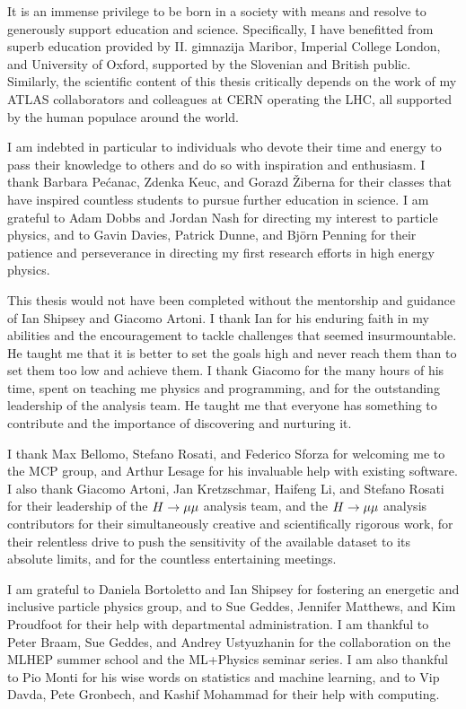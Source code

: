\begin{acknowledgements}

It is an immense privilege to be born in a society with means and resolve
to generously support education and science. Specifically, I have benefitted
from superb education provided by II. gimnazija Maribor, Imperial College
London, and University of Oxford, supported by the Slovenian and British
public. Similarly, the scientific content of this thesis critically depends
on the work of my ATLAS collaborators and colleagues at CERN operating the
LHC, all supported by the human populace around the world.

I am indebted in particular to individuals who devote their time and energy
to pass their knowledge to others and do so with inspiration and enthusiasm.
I thank Barbara Pe\'canac, Zdenka Keuc, and Gorazd
\v{Z}iberna for their classes that have inspired countless students to pursue
further education in science. I am grateful to Adam Dobbs and Jordan Nash for
directing my interest to particle physics, and to Gavin Davies, Patrick Dunne,
and Bj\"{o}rn Penning for their patience and perseverance in directing my
first research efforts in high energy physics.

This thesis would not have been completed without the mentorship and guidance
of Ian Shipsey and Giacomo Artoni. I thank Ian for his enduring faith in my
abilities and the encouragement to tackle challenges that seemed insurmountable.
He taught me that it is better to set the goals high and never reach them
than to set them too low and achieve them.
I thank Giacomo for the many hours of his time, spent on teaching me physics and
programming, and for the outstanding leadership of the analysis team. He taught
me that everyone has something to contribute and the importance of discovering 
and nurturing it.

I thank Max Bellomo, Stefano Rosati, and Federico Sforza for welcoming me to
the MCP group, and Arthur Lesage for his invaluable help with existing
software. I also thank Giacomo Artoni, Jan Kretzschmar, Haifeng Li, and Stefano
Rosati for their leadership of the $H \rightarrow \mu\mu$ analysis team, and the $H \rightarrow \mu\mu$
analysis contributors for their simultaneously creative and scientifically
rigorous work, for their relentless drive to push the sensitivity of the
available dataset to its absolute limits, and for the countless entertaining
meetings.

I am grateful to Daniela Bortoletto and Ian Shipsey for fostering an energetic
and inclusive particle physics group, and to Sue Geddes, Jennifer Matthews,
and Kim Proudfoot for their help with departmental administration. I am
thankful to Peter Braam, Sue Geddes, and Andrey Ustyuzhanin for the
collaboration on the MLHEP summer school and the ML+Physics seminar series.
I am also thankful to Pio Monti for his wise words on statistics and machine
learning, and to Vip Davda, Pete Gronbech, and Kashif Mohammad for their help
with computing.


\end{acknowledgements}
